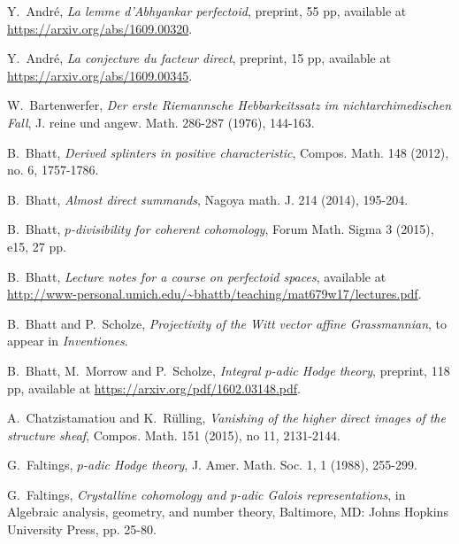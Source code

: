\documentclass[10pt,reqno]{amsart}
\begin{document}
\begin{thebibliography}{HKM}

Y.~Andr\'e, \emph{La lemme d'Abhyankar perfectoid}, preprint, 55 pp, available at \url{https://arxiv.org/abs/1609.00320}.

Y.~Andr\'e, \emph{La conjecture du facteur direct}, preprint, 15 pp, available at \url{https://arxiv.org/abs/1609.00345}.

W.~Bartenwerfer, \emph{Der erste Riemannsche Hebbarkeitssatz im nichtarchimedischen Fall}, J. reine und angew. Math. 286-287 (1976), 144-163.

B.~Bhatt, \emph{Derived splinters in positive characteristic},  Compos. Math. 148 (2012), no. 6, 1757-1786.

B.~Bhatt, \emph{Almost direct summands}, Nagoya math. J. 214 (2014), 195-204.

B.~Bhatt, \emph{$p$-divisibility for coherent cohomology}, Forum Math. Sigma 3 (2015), e15, 27 pp.

B.~Bhatt, \emph{Lecture notes for a course on perfectoid spaces}, available at \url{http://www-personal.umich.edu/~bhattb/teaching/mat679w17/lectures.pdf}.

B.~Bhatt and P.~Scholze, \emph{Projectivity of the Witt vector affine Grassmannian}, to appear in {\em Inventiones}. 

B.~Bhatt, M.~Morrow and P.~Scholze, \emph{Integral $p$-adic Hodge theory}, preprint, 118 pp, available at \url{https://arxiv.org/pdf/1602.03148.pdf}.

A.~Chatzistamatiou and K.~R\"{u}lling, \emph{Vanishing of the higher direct images of the structure sheaf}, Compos. Math. 151 (2015), no 11, 2131-2144.


G.~Faltings, \emph{$p$-adic Hodge theory}, J. Amer. Math. Soc. 1, 1 (1988), 255-299.

G.~Faltings, \emph{Crystalline cohomology and p-adic Galois representations}, in  Algebraic analysis, geometry, and number theory, Baltimore, MD: Johns Hopkins University Press, pp. 25-80.


\end{thebibliography}
\end{document}
